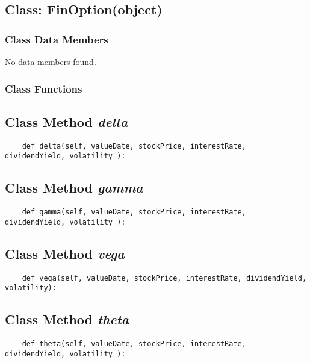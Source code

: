 \documentclass[twoside,11pt]{book}
\begin{document}
\subsection{Class: FinOption(object)}


\subsubsection{Class Data Members}
No data members found.

\subsubsection{Class Functions}

\subsection{Class Method {\it delta}}


\begin{lstlisting}
    def delta(self, valueDate, stockPrice, interestRate, dividendYield, volatility ):
\end{lstlisting}

\subsection{Class Method {\it gamma}}


\begin{lstlisting}
    def gamma(self, valueDate, stockPrice, interestRate, dividendYield, volatility ):
\end{lstlisting}

\subsection{Class Method {\it vega}}


\begin{lstlisting}
    def vega(self, valueDate, stockPrice, interestRate, dividendYield, volatility):
\end{lstlisting}

\subsection{Class Method {\it theta}}


\begin{lstlisting}
    def theta(self, valueDate, stockPrice, interestRate, dividendYield, volatility ):
\end{lstlisting}
\end{document}
